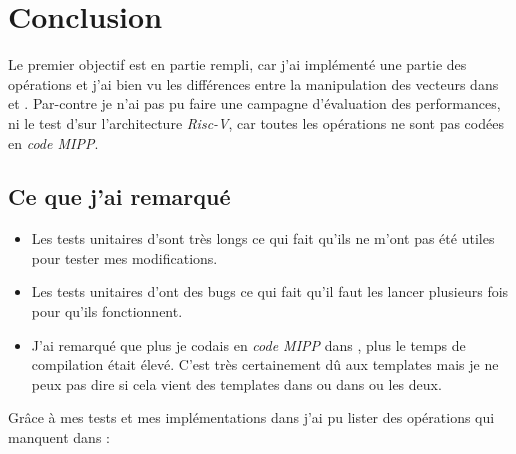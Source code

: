 \section{Conclusion}

Le premier objectif est en partie rempli, car j'ai implémenté une partie des opérations et
j'ai bien vu les différences entre la manipulation des vecteurs dans \Eigen et \MIPP.
Par-contre je n'ai pas pu faire une campagne d'évaluation des performances, ni le test
d'\Eigen sur l'architecture \emph{Risc-V}, car toutes les opérations ne sont pas codées en
\emph{code MIPP}.

\subsection{Ce que j'ai remarqué}

\begin{itemize}
  \item Les tests unitaires d'\Eigen sont très longs ce qui fait qu'ils ne m'ont pas été utiles
  pour tester mes modifications.
  \item Les tests unitaires d'\Eigen ont des bugs ce qui fait qu'il faut les lancer
  plusieurs fois pour qu'ils fonctionnent.
  \item J'ai remarqué que plus je codais en \emph{code MIPP} dans \Eigen, plus le temps de
  compilation était élevé. C'est très certainement dû aux templates mais je ne peux pas dire
  si cela vient des templates dans \MIPP ou dans \Eigen ou les deux.
\end{itemize}

Grâce à mes tests et mes implémentations \MIPP dans \Eigen j'ai pu lister des opérations
qui manquent dans \MIPP :

